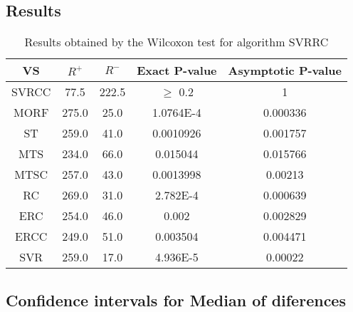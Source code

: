 \documentclass[a4paper,10pt]{article}
\begin{document}
\subsection{Results}

\begin{table}[!htp]
\centering\small
\begin{tabular}{
|c|c|c|c|c|}
\hline
 VS & $R^{+}$ & $R^{-}$ & Exact P-value & Asymptotic P-value \\ \hline 
SVRCC & 77.5 & 222.5 & $\geq$ 0.2 & 1\\ \hline 
MORF & 275.0 & 25.0 & 1.0764E-4 & 0.000336\\ \hline 
ST & 259.0 & 41.0 & 0.0010926 & 0.001757\\ \hline 
MTS & 234.0 & 66.0 & 0.015044 & 0.015766\\ \hline 
MTSC & 257.0 & 43.0 & 0.0013998 & 0.00213\\ \hline 
RC & 269.0 & 31.0 & 2.782E-4 & 0.000639\\ \hline 
ERC & 254.0 & 46.0 & 0.002 & 0.002829\\ \hline 
ERCC & 249.0 & 51.0 & 0.003504 & 0.004471\\ \hline 
SVR & 259.0 & 17.0 & 4.936E-5 & 0.00022\\ \hline 

\end{tabular}
\caption{Results obtained by the Wilcoxon test for algorithm SVRRC}
\end{table}

\subsection{Confidence intervals for Median of diferences}
\end{document}
